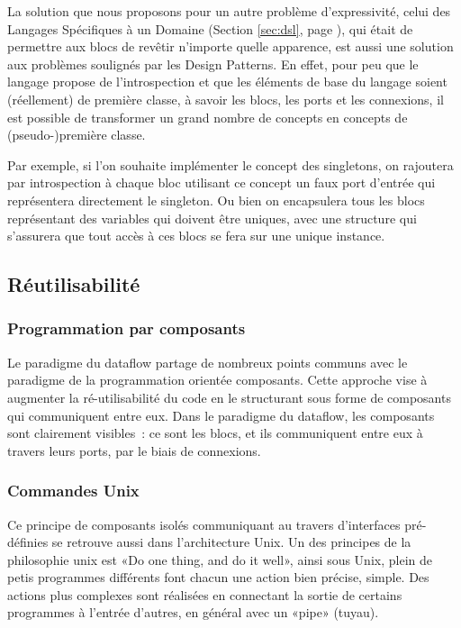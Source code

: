\documentclass{article}
\begin{document}
La solution que nous proposons pour un autre problème d'expressivité, celui des Langages Spécifiques à un Domaine (Section \ref{sec:dsl},
page \pageref{sec:dsl}), qui était de permettre aux blocs de revêtir n'importe quelle apparence, est aussi une solution aux problèmes
soulignés par les Design Patterns. En effet, pour peu que le langage propose de l'introspection et que les éléments de base du langage
soient (réellement) de première classe, à savoir les blocs, les ports et les connexions, il est possible de transformer un grand nombre de
concepts en concepts de (pseudo-)première classe.

Par exemple, si l'on souhaite implémenter le concept des singletons, on rajoutera par introspection à chaque bloc utilisant ce concept un
faux port d'entrée qui représentera directement le singleton. Ou bien on encapsulera tous les blocs représentant des variables qui doivent
être uniques, avec une structure qui s'assurera que tout accès à ces blocs se fera sur une unique instance.

\subsection{Réutilisabilité}

\subsubsection{Programmation par composants}

Le paradigme du dataflow partage de nombreux points communs avec le paradigme de la programmation orientée composants. Cette approche vise à
augmenter la ré-utilisabilité du code en le structurant sous forme de composants qui communiquent entre eux. Dans le paradigme du dataflow,
les composants sont clairement visibles~: ce sont les blocs, et ils communiquent entre eux à travers leurs ports, par le biais de
connexions.

\subsubsection{Commandes Unix}

Ce principe de composants isolés communiquant au travers d'interfaces pré-définies se retrouve aussi dans l'architecture Unix. Un des
principes de la philosophie unix est «Do one thing, and do it well», ainsi sous Unix, plein de petis programmes différents font chacun une
action bien précise, simple. Des actions plus complexes sont réalisées en connectant la sortie de certains programmes à l'entrée d'autres,
en général avec un «pipe» (tuyau).
\end{document}
